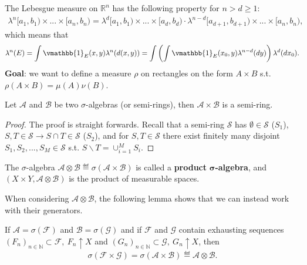 The Lebesgue measure on \(\mathbb{R}^n\) has the following property for \(n>d\geq1\):
\begin{align*}
    \lambda^n[a_1,b_1) \times  ... \times [a_n, b_n) = 
    \lambda^d[a_1,b_1) \times  ... \times [a_d, b_d) \cdot 
    \lambda^{n-d}[a_{d+1}, b_{d+1})  \times  ... \times [a_n, b_n),
\end{align*}
which means that
\begin{align*}
    \lambda^n(E) = 
    \int\vmathbb{1}_{E}(x,y)\lambda^n(d(x,y))=
    \int\left(\int \vmathbb{1}_{E}(x_0,y)\lambda^{n-d}(dy)\right) \lambda^d(dx_0).
\end{align*}
\textbf{Goal}: we want to define a measure \(\rho\) on rectangles on the form \(A\times B\) s.t. \(\rho(A\times B)=\mu(A)\nu(B)\).
\begin{lemma}
    Let \(\mathscr{A}\) and \(\mathscr{B}\) be two \(\sigma\)-algebras (or semi-rings), then \(\mathscr{A}\times\mathscr{B}\) is a semi-ring.
\end{lemma}
\begin{proof}
    The proof is straight forwards. Recall that a semi-ring \(\mathcal{S}\) has \(\emptyset\in\mathcal{S}\) (\(S_1\)), \(S,T\in \mathcal{S}\rightarrow S\cap T\in\mathcal{S}\) (\(S_2\)), and for \(S,T\in\mathcal{S}\) there exist finitely many disjoint \(S_1, S_2, ..., S_M\in\mathcal{S}\) s.t. \(S\backslash T = \cup_{i=1}^{M}S_i\).
\end{proof}
\begin{definition}
    The \(\sigma\)-algebra \(\mathscr{A}\otimes \mathscr{B}\eqdef \sigma\left(\mathscr{A}\times \mathscr{B}\right)\) is called a \textbf{product} \(\boldsymbol{\sigma}\)\textbf{-algebra}, and \(\left(X\times Y, \mathscr{A}\otimes\mathscr{B}\right)\) is the product of measurable spaces.
\end{definition}
When considering \(\mathscr{A}\otimes\mathscr{B}\), the following lemma shows that we can instead work with their generators.
\begin{lemma}   \label{lemma:generator_product_sigma}
    If \(\mathscr{A}=\sigma(\mathscr{F})\) and \(\mathscr{B}=\sigma(\mathscr{G})\) and if \(\mathscr{F}\) and \(\mathscr{G}\) contain exhausting sequences \((F_n)_{n\in\mathbb{N}}\subset \mathscr{F}, \ F_n\uparrow X\) and \((G_n)_{n\in\mathbb{N}}\subset \mathscr{G}, \ G_n\uparrow X\), then
    \begin{align*}
        \sigma\left(\mathscr{F}\times \mathscr{G}\right) = \sigma\left(\mathscr{A}\times\mathscr{B}\right) \eqdef \mathscr{A}\otimes\mathscr{B}.
    \end{align*}
\end{lemma}
